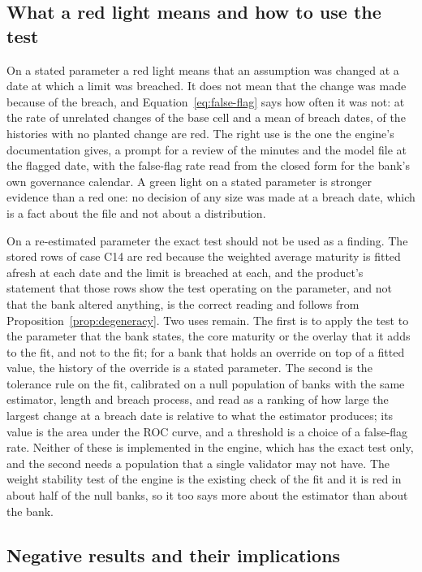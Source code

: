 \subsection{What a red light means and how to use the test}
\label{sec:disc-use}

On a stated parameter a red light means that an assumption was changed at a date at which a limit was breached. It does not mean that the change was made because of the breach, and Equation~\eqref{eq:false-flag} says how often it was not: at the rate of unrelated changes of the base cell and a mean of \statedMeanM{} breach dates, \statedNullEngine{} of the histories with no planted change are red. The right use is the one the engine's documentation gives, a prompt for a review of the minutes and the model file at the flagged date, with the false-flag rate read from the closed form for the bank's own governance calendar. A green light on a stated parameter is stronger evidence than a red one: no decision of any size was made at a breach date, which is a fact about the file and not about a distribution.

On a re-estimated parameter the exact test should not be used as a finding. The stored rows of case C14 are red because the weighted average maturity is fitted afresh at each date and the limit is breached at each, and the product's statement that those rows show the test operating on the parameter, and not that the bank altered anything, is the correct reading and follows from Proposition~\ref{prop:degeneracy}. Two uses remain. The first is to apply the test to the parameter that the bank states, the core maturity or the overlay that it adds to the fit, and not to the fit; for a bank that holds an override on top of a fitted value, the history of the override is a stated parameter. The second is the tolerance rule on the fit, calibrated on a null population of banks with the same estimator, length and breach process, and read as a ranking of how large the largest change at a breach date is relative to what the estimator produces; its value is the area under the ROC curve, and a threshold is a choice of a false-flag rate. Neither of these is implemented in the engine, which has the exact test only, and the second needs a population that a single validator may not have. The weight stability test of the engine is the existing check of the fit and it is red in about half of the null banks, so it too says more about the estimator than about the bank.

\subsection{Negative results and their implications}
\label{sec:disc-negative}

